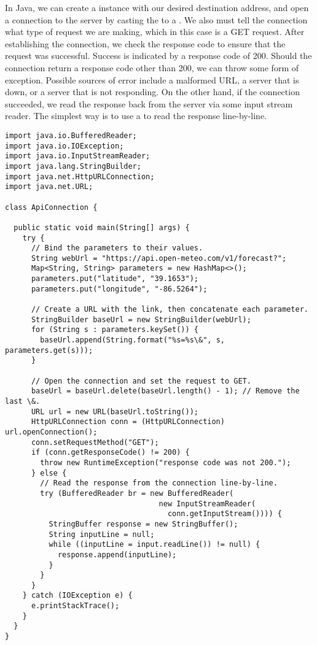 In Java, we can create a  instance with our desired destination address, and open a connection to the server by casting the  to a . 
We also must tell the connection what type of request we are making, which in this case is a GET request. 
After establishing the connection, we check the response code to ensure that the request was successful. 
Success is indicated by a response code of 200. 
Should the connection return a response code other than 200, we can throw some form of exception. 
Possible sources of error include a malformed URL, a server that is down, or a server that is not responding.
On the other hand, if the connection succeeded, we read the response back from the server via some input stream reader. 
The simplest way is to use a  to read the response line-by-line.

\begin{lstlisting}[language=MyJava]
import java.io.BufferedReader;
import java.io.IOException;
import java.io.InputStreamReader;
import java.lang.StringBuilder;
import java.net.HttpURLConnection;
import java.net.URL;

class ApiConnection {

  public static void main(String[] args) {
    try {
      // Bind the parameters to their values.
      String webUrl = "https://api.open-meteo.com/v1/forecast?";
      Map<String, String> parameters = new HashMap<>();
      parameters.put("latitude", "39.1653");
      parameters.put("longitude", "-86.5264");

      // Create a URL with the link, then concatenate each parameter.
      StringBuilder baseUrl = new StringBuilder(webUrl);
      for (String s : parameters.keySet()) { 
        baseUrl.append(String.format("%s=%s\&", s, parameters.get(s))); 
      }
    
      // Open the connection and set the request to GET.
      baseUrl = baseUrl.delete(baseUrl.length() - 1); // Remove the last \&.
      URL url = new URL(baseUrl.toString());
      HttpURLConnection conn = (HttpURLConnection) url.openConnection();
      conn.setRequestMethod("GET");
      if (conn.getResponseCode() != 200) {
        throw new RuntimeException("response code was not 200.");
      } else {
        // Read the response from the connection line-by-line.
        try (BufferedReader br = new BufferedReader(
                                   new InputStreamReader(
                                     conn.getInputStream()))) {
          StringBuffer response = new StringBuffer();
          String inputLine = null;
          while ((inputLine = input.readLine()) != null) { 
            response.append(inputLine); 
          }
        }
      }
    } catch (IOException e) {
      e.printStackTrace();
    }
  }
}
\end{lstlisting}

